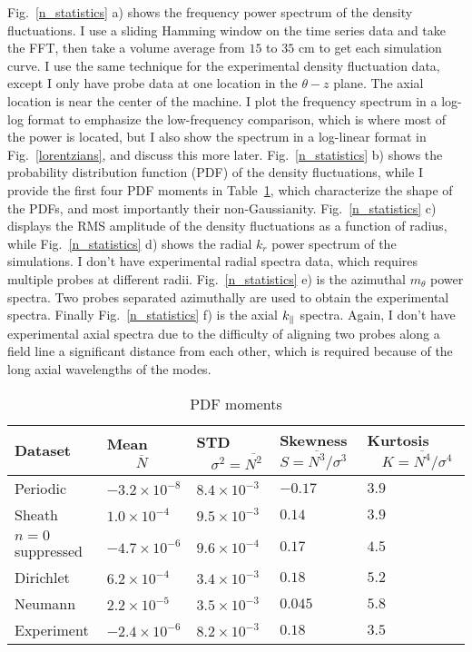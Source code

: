 Fig.~\ref{n_statistics} a) shows the frequency power spectrum of the density fluctuations. I use a sliding Hamming window on the time series data and take the FFT, then take a volume
average from $15$ to $35$ cm to get each simulation curve. I use the same technique for the experimental density fluctuation data, except I only have probe data at one location in the
$\theta-z$ plane. The axial location is near the center of the machine. I plot the frequency spectrum in a log-log format to emphasize the low-frequency comparison, which is where most of the
power is located, but I also show the spectrum in a log-linear format in Fig.~\ref{lorentzians}, and discuss this more later.
Fig.~\ref{n_statistics} b) shows the probability distribution function (PDF) of the density fluctuations, while I provide the first four PDF moments in Table~\ref{pdf_moments}, which characterize
the shape of the PDFs, and most importantly their non-Gaussianity.
Fig.~\ref{n_statistics} c) displays the RMS amplitude of the density fluctuations as a function of radius, while Fig.~\ref{n_statistics} d) shows the radial $k_r$ power spectrum of the simulations.
I don't have experimental radial spectra data, which requires multiple probes at different radii. Fig.~\ref{n_statistics} e) is the azimuthal $m_\theta$ power spectra. 
Two probes separated azimuthally are used to obtain the experimental spectra. Finally Fig.~\ref{n_statistics} f) is the axial $k_\parallel$ spectra. Again, I don't have experimental axial spectra due
to the difficulty of aligning two probes along a field line a significant distance from each other, which is required because of the long axial wavelengths of the modes.

\begin{table}
\label{pdf_moments}
\setlength{\tabcolsep}{12pt}
\begin{tabular}{| p{2cm} || p{2cm} | p{2cm} | p{2cm} | p{2.2cm} |}
\hline 
Dataset & Mean $\quad \quad \overline{N}$ & STD $\quad \sigma^2 = \overline{N^2}$ & Skewness $S = \overline{N^3}/\sigma^3$ & Kurtosis $\quad K = \overline{N^4}/\sigma^4$ \\ \hline \hline
Periodic & $-3.2 \times 10^{-8}$ & $8.4 \times 10^{-3}$ & $-0.17$ & $3.9$ \\ \hline
Sheath  & $1.0 \times 10^{-4}$ & $9.5 \times 10^{-3}$ & $0.14$ & $3.9$ \\ \hline
$n=0 \quad$ suppressed & $-4.7 \times 10^{-6}$ & $9.6 \times 10^{-4}$ & $0.17$ & $4.5$ \\ \hline
Dirichlet & $6.2 \times 10^{-4}$ & $3.4 \times 10^{-3}$ & $0.18$ & $5.2$ \\ \hline
Neumann & $2.2 \times 10^{-5}$ & $3.5 \times 10^{-3}$ & $0.045$ & $5.8$ \\ \hline
Experiment & $-2.4 \times 10^{-6}$ & $8.2 \times 10^{-3}$ & $0.18$ & $3.5$ \\ \hline
\end{tabular}
\caption{PDF moments}
\end{table}

